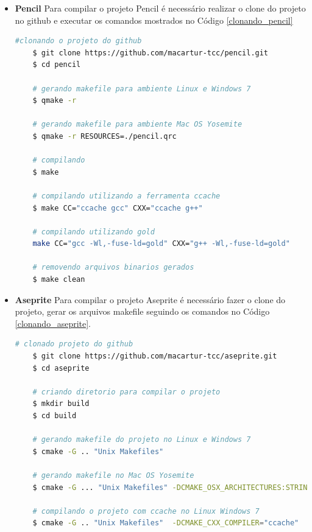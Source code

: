 \begin{itemize}
\begin{lstlisting}[language=bash, caption={Clonado e compilando o Projeto Sudoku},
                  label=clonando_sudoku]
\end{lstlisting}

    \item \textbf{Pencil}
    \subitem Para compilar o projeto Pencil é necessário realizar
 o clone do projeto no github e executar os comandos mostrados no
 Código \ref{clonando_pencil} 

\begin{lstlisting}[language=bash, caption={Clonado Projeto Pencil},
                  label=clonando_pencil]
    #clonando o projeto do github
    $ git clone https://github.com/macartur-tcc/pencil.git
    $ cd pencil

    # gerando makefile para ambiente Linux e Windows 7
    $ qmake -r

    # gerando makefile para ambiente Mac OS Yosemite
    $ qmake -r RESOURCES=./pencil.qrc  
    
    # compilando 
    $ make

    # compilando utilizando a ferramenta ccache
    $ make CC="ccache gcc" CXX="ccache g++"

    # compilando utilizando gold
    make CC="gcc -Wl,-fuse-ld=gold" CXX="g++ -Wl,-fuse-ld=gold"

    # removendo arquivos binarios gerados
    $ make clean

\end{lstlisting}

    \item \textbf{Aseprite}
    \subitem Para compilar o projeto Aseprite é necessário fazer o clone do projeto,
 gerar os arquivos makefile seguindo os comandos no Código \ref{clonando_aseprite}.

\begin{lstlisting}[language=bash, caption={Clonado Projeto Aseprite e criando diretório de Compilação},
                  label=clonando_aseprite]
    # clonado projeto do github
    $ git clone https://github.com/macartur-tcc/aseprite.git
    $ cd aseprite

    # criando diretorio para compilar o projeto
    $ mkdir build
    $ cd build

    # gerando makefile do projeto no Linux e Windows 7
    $ cmake -G .. "Unix Makefiles"

    # gerando makefile no Mac OS Yosemite
    $ cmake -G ... "Unix Makefiles" -DCMAKE_OSX_ARCHITECTURES:STRING=i386  -DCMAKE_OSX_DEPLOYMENT_TARGET:STRING=10.4  -DCMAKE_OSX_SYSROOT:STRING=/SDKs/MacOSX10.4u.sdk
    
    # compilando o projeto com ccache no Linux Windows 7
    $ cmake -G .. "Unix Makefiles"  -DCMAKE_CXX_COMPILER="ccache"  -DCMAKE_CXX_COMPILER_ARG1="g++" -DCMAKE_C_COMPILER="ccache" -DCMAKE_C_COMPILER_ARG1="gcc"


\end{lstlisting}
\end{itemize}
